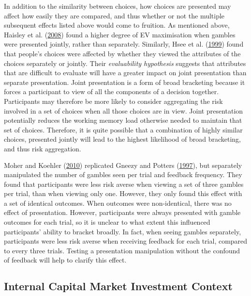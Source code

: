 \documentclass[
  english,
  man, donotrepeattitle,floatsintext]{apa7}
\theoremstyle{definition}
\theoremstyle{definition}
\theoremstyle{definition}
\theoremstyle{definition}
\theoremstyle{remark}
\begin{document}
In addition to the similarity between choices, how choices are presented may
affect how easily they are compared, and thus whether or not the multiple
subsequent effects listed above would come to fruition. As mentioned above,
Haisley et al. (\protect\hyperlink{ref-haisley2008}{2008}) found a higher degree of EV maximisation when gambles were
presented jointly, rather than separately. Similarly, Hsee et al. (\protect\hyperlink{ref-hsee1999}{1999}) found that
people's choices were affected by whether they viewed the attributes of the
choices separately or jointly. Their \emph{evaluability hypothesis} suggests that
attributes that are difficult to evaluate will have a greater impact on joint
presentation than separate presentation. Joint presentation is a form of broad
bracketing because it forces a participant to view of all the components of a
decision together. Participants may therefore be more likely to consider
aggregating the risk involved in a set of choices when all those choices are in
view. Joint presentation potentially reduces the working memory load otherwise
needed to maintain that set of choices. Therefore, it is quite possible that a
combination of highly similar choices, presented jointly will lead to the
highest likelihood of broad bracketing, and thus risk aggregation.

Moher and Koehler (\protect\hyperlink{ref-moher2010}{2010}) replicated Gneezy and Potters (\protect\hyperlink{ref-gneezy1997}{1997}), but separately manipulated the number of
gambles seen per trial and feedback frequency. They found that participants were
less risk averse when viewing a set of three gambles per trial, than when
viewing only one. However, they only found this effect with a set of identical
outcomes. When outcomes were non-identical, there was no effect of presentation.
However, participants were always presented with gamble outcomes for each trial,
so it is unclear to what extent this influenced participants' ability to bracket
broadly. In fact, when seeing gambles separately, participants were less risk
averse when receiving feedback for each trial, compared to every three trials.
Testing a presentation manipulation without the confound of feedback will help
to clarify this effect.

\hypertarget{internal-capital-market-investment-context}{%
\subsection{Internal Capital Market Investment Context}\label{internal-capital-market-investment-context}}
\end{document}
